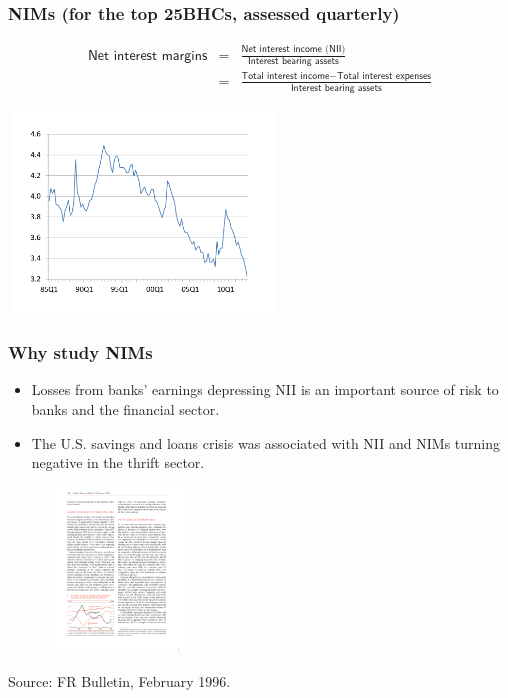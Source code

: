 \documentclass[handout]{beamer}
\begin{document}
\begin{frame}
\frametitle{NIMs (for the top 25BHCs, assessed quarterly)}

\vspace{-0.15in}
\begin{eqnarray}\textsf{Net interest margins}\!\!\!\!&=&\!\!\!\!\frac{\textsf{Net interest income (NII)}}{\textsf{Interest bearing assets}} \nonumber \\
                \!\!\!\!&=&\!\!\!\!\frac{\textsf{Total interest income}-\textsf{Total interest expenses}}{\textsf{Interest bearing assets}}  \nonumber
\end{eqnarray}
\begin{center}
\includegraphics[height=5.4cm,width=7.2cm]{nims_crop.pdf}
\end{center}

\end{frame}


\begin{frame}
\frametitle{Why study NIMs}
\begin{itemize}
\item \vspace{0.0in} Losses from banks' earnings depressing NII is an important source of risk to banks and the financial sector.
\item \vspace{0.1in} The U.S. savings and loans crisis was associated with NII and NIMs turning negative in the thrift sector.
\end{itemize}
\begin{center}
\includegraphics[height=4.4cm,width=5.9cm]{NIMs_Thrifts_CROP.pdf}
\end{center}
\vspace{-0.2in} \hspace{1.0in} {\tiny{Source: FR Bulletin, February 1996.}}\normalsize
\end{frame}
\end{document}
